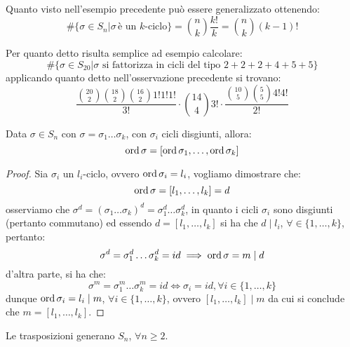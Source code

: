 \documentclass[11pt]{scrartcl}
\begin{document}
\begin{remark}
    Quanto visto nell'esempio precedente può essere generalizzato ottenendo:
        \[ \#\{\sigma \in S_n | \sigma\,\text{è un $k$-ciclo}\} = \binom{n}{k}\frac{k!}{k} = \binom{n}{k}(k-1)!
            \]
\end{remark}

\begin{example}
    Per quanto detto risulta semplice ad esempio calcolare:
        \[ \#\{\sigma \in S_{20} | \text{$\sigma$ si fattorizza in cicli del tipo $2+2+2+4+5+5$}\}
            \]
    applicando quanto detto nell'osservazione precedente si trovano:
        \[ \frac{\binom{20}{2}\binom{18}{2}\binom{16}{2}1!1!1!}{3!} \cdot \binom{14}{4}3! \cdot \frac{\binom{10}{5}\binom{5}{5}4!4!}{2!}
            \]
\end{example}

\begin{proposition}
    Data $\sigma \in S_n$ con $\sigma = \sigma_1\ldots\sigma_k$, con $\sigma_i$ cicli disgiunti, allora:
        \[ \operatorname{ord} \sigma = [\operatorname{ord} \sigma_1,\ldots, \operatorname{ord}\sigma_k]
            \]
\end{proposition}

\begin{proof}
    Sia $\sigma_i$ un $l_i$-ciclo, ovvero $\operatorname{ord}\sigma_i = l_i$, vogliamo dimostrare che:
        \[ \operatorname{ord}\sigma = [l_1,\ldots,l_k] = d
            \]
    osserviamo che $\sigma^d = (\sigma_1\ldots\sigma_k)^d = \sigma_1^d\ldots\sigma_k^d$, in quanto i cicli $\sigma_i$ sono disgiunti (pertanto commutano)
    ed essendo $d = [l_1,\ldots,l_k]$ si ha che $d \mid l_i$, $\forall \in \{1,\ldots,k\}$, pertanto:
        \[ \sigma^d = \sigma_1^d\ldots\sigma_k^d = id \implies \operatorname{ord} \sigma = m \mid d
            \]
    d'altra parte, si ha che:
        \[ \sigma^m = \sigma_1^m\ldots\sigma_k^m = id \iff \sigma_i = id, \forall i \in\{1,\ldots,k\}
            \]
    dunque $\operatorname{ord} \sigma_i = l_i \mid m$, $\forall i \in\{1,\ldots,k\}$, ovvero $[l_1,\ldots,l_k] \mid m$ da cui si conclude che $m = [l_1,\ldots,l_k]$.
\end{proof}

\begin{proposition}
    \label{trasp}
    Le trasposizioni generano $S_n$, $\forall n \geq 2$.
\end{proposition}
\end{document}
